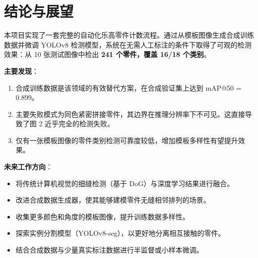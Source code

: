 \documentclass[12pt,a4paper]{ctexart}
\begin{document}
\section{结论与展望}

本项目实现了一套完整的自动化乐高零件计数流程。通过从模板图像生成合成训练数据并微调 YOLOv8 检测模型，系统在无需人工标注的条件下取得了可观的检测效果：从 10 张测试图像中检出 \textbf{241 个零件，覆盖 16/18 个类别}。

\textbf{主要发现}：

\begin{enumerate}
    \item 合成训练数据是该领域的有效替代方案，在合成验证集上达到 mAP@50 = 0.899。
    \item 主要失败模式为同色紧密拼接零件，其边界在推理分辨率下不可见。这直接导致了图 2 近乎完全的检测失败。
    \item 仅有一张模板图像的零件类别检测可靠度较低，增加模板多样性有望提升效果。
\end{enumerate}

\textbf{未来工作方向}：

\begin{itemize}
    \item 将传统计算机视觉的细缝检测（基于 DoG）与深度学习结果进行融合。
    \item 改进合成数据生成器，使其能够建模零件无缝相邻排列的场景。
    \item 收集更多颜色和角度的模板图像，提升训练数据多样性。
    \item 探索实例分割模型（YOLOv8-seg），以更好地分离相互接触的零件。
    \item 结合合成数据与少量真实标注数据进行半监督或小样本微调。
\end{itemize}
\end{document}
